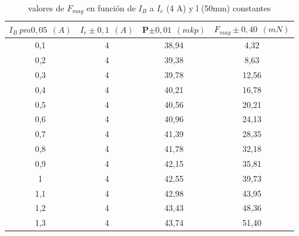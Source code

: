 \documentclass[12pt,a4paper]{book}
\begin{document}
\newpage

\vspace*{2.5cm}

\begin{table}[h!]
\begin{center}
\begin{tabular}{|c|c|c|c|}
\hline
$I_B  \ pm 0,05 \ \  (A)$ & 	 $I_e \pm 0,1 \ \ (A) $ & 	 P$\pm 0,01\ \ (mkp)$ & 	 $F_{mag} \pm 0,40 \ \ (mN)$ \\ \hline
0,1 & 	 4 & 	 38,94 & 	 4,32 \\ 
0,2 & 	 4 & 	 39,38 & 	 8,63 \\ 
0,3 & 	 4 & 	 39,78 & 	 12,56 \\ 
0,4 & 	 4 & 	 40,21 & 	 16,78 \\ 
0,5 & 	 4 & 	 40,56 & 	 20,21 \\ 
0,6 & 	 4 & 	 40,96 & 	 24,13 \\ 
0,7 & 	 4 & 	 41,39 & 	 28,35 \\ 
0,8 & 	 4 & 	 41,78 & 	 32,18 \\ 
0,9 & 	 4 & 	 42,15 & 	 35,81 \\ 
1 & 	 4 & 	 42,55 & 	 39,73 \\ 
1,1 & 	 4 & 	 42,98 & 	 43,95 \\ 
1,2 & 	 4 & 	 43,43 & 	 48,36 \\ 
1,3 & 	 4 & 	 43,74 & 	 51,40 \\ 
\hline
\end{tabular}
\label{Tab: Fmag vs IB a l=50mm balanza}
\caption{valores de $F_{mag}$ en función de $I_B$ a $I_e$ (4 A) y l (50mm) constantes }
\end{center}
\end{table}
\end{document}
